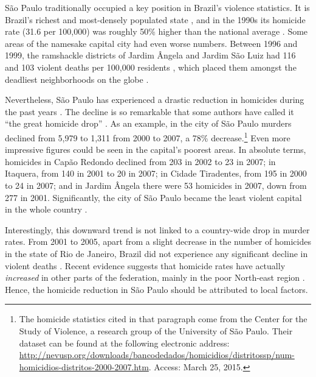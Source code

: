 \documentclass[a4paper,11pt]{article}
\begin{document}
S\~{a}o Paulo traditionally occupied a key position in Brazil's violence statistics. It is Brazil's richest \citep{ibge2012} and most-densely populated state \citep{ibge2014}, and in the 1990s its homicide rate (31.6 per 100,000) was roughly 50\% higher than the national average \citep{barata2000}. Some areas of the namesake capital city had even worse numbers. Between 1996 and 1999, the ramshackle districts of Jardim \^{A}ngela and Jardim S\~{a}o Luiz had 116 and 103 violent deaths per 100,000 residents \citep[8]{cardia2003}, which placed them amongst the deadliest neighborhoods on the globe \citep{who2015}.

Nevertheless, S\~{a}o Paulo has experienced a drastic reduction in homicides during the past years \citep{camargo2007}. The decline is so remarkable that some authors have called it ``the great homicide drop'' \citep{goertzel2009}. As an example, in the city of S\~{a}o Paulo murders declined from 5,979 to 1,311 from 2000 to 2007, a 78\% decrease.\footnote{The homicide statistics cited in that paragraph come from the Center for the Study of Violence, a research group of the University of S\~{a}o Paulo. Their dataset can be found at the following electronic address: \href{http://nevusp.org/downloads/bancodedados/homicidios/distritossp/num-homicidios-distritos-2000-2007.htm}{http://nevusp.org/downloads/bancodedados/homicidios/distritossp/num-homicidios-distritos-2000-2007.htm}. Access: March 25, 2015.} Even more impressive figures could be seen in the capital's poorest areas. In absolute terms, homicides in Cap\~{a}o Redondo declined from 203 in 2002 to 23 in 2007; in Itaquera, from 140 in 2001 to 20 in 2007; in Cidade Tiradentes, from 195 in 2000 to 24 in 2007; and in Jardim \^{A}ngela there were 53 homicides in 2007, down from 277 in 2001. Significantly, the city of S\~{a}o Paulo became the least violent capital in the whole country \citep{mapa2011}.

Interestingly, this downward trend is not linked to a country-wide drop in murder rates. From 2001 to 2005, apart from a slight decrease in the number of homicides in the state of Rio de Janeiro, Brazil did not experience any significant decline in violent deaths \citep{goertzel2009}. Recent evidence suggests that homicide rates have actually \textit{increased} in other parts of the federation, mainly in the poor North-east region \citep{souza2014}. Hence, the homicide reduction in S\~{a}o Paulo should be attributed to local factors. 
\end{document}

